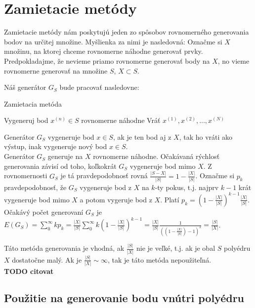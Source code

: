\chapter{Zamietacie metódy}

Zamietacie metódy nám poskytujú jeden zo spôsobov rovnomerného generovania bodov na určitej množine.
Myšlienka za nimi je nasledovná: Označme si $X$ množinu, na ktorej chceme rovnomerne náhodne generovať prvky. Predpokladajme, že nevieme priamo rovnomerne generovať body na $X$, no vieme rovnomerne generovať na množine $S$, $X \subset S$.

Náš generátor $G_S$ bude pracovať nasledovne:

\begin{algorithm}[H]
	\caption{Zamietacia metóda}
	\label{zamietanie:basic}
	\begin{algorithmic}[1]
			\Repeat Vygeneruj bod $x^{(n)} \in S$ rovnomerne náhodne
		\EndFor
		\State Vráť ${x^{(1)},x^{(2)},\dots,x^{(N)}}$
	\end{algorithmic}
\end{algorithm}
Generátor $G_S$ vygeneruje bod $x \in S$, ak je ten bod aj z $X$, tak ho vráti ako výstup, inak vygeneruje nový bod $x \in S$.\\

Generátor $G_S$ generuje na $X$ rovnomerne náhodne. Očakávaná rýchlosť generovania závisí od toho, koľkokrát $G_S$ vygeneruje bod mimo $X$. Z rovnomernosti $G_S$ je tá pravdepodobnosť rovná $\frac{|S-X|}{|S|} = 1-\frac{|X|}{|S|}$. Označme si $p_k$ pravdepodobnosť, že $G_S$ vygeneruje bod z $X$ na $k$-ty pokus, t.j. najprv $k-1$ krát vygeneruje bod mimo $X$ a potom vygeruje bod z $X$. Platí $p_k= (1-\frac{|X|}{|S|})^{k-1}\frac{|X|}{|S|}$. Očakávý počet generovaní $G_S$ je $E(G_S)=\sum^{\infty}_{0}kp_k=\frac{|X|}{|S|} \sum^{\infty}_{0}k(1-\frac{|X|}{|S|})^{k-1}=\frac{|X|}{|S|} \frac{1}{((1-\frac{|X|}{|S|})-1)^2} = \frac{|S|}{|X|}$.

Táto metóda generovania je vhodná, ak $\frac{|S|}{|X|}$ nie je veľké, t.j. ak je obal $S$ polyédru $X$ dostatočne malý. Ak je $\frac{|S|}{|X|} \sim \infty$, tak je táto metóda nepoužiteľná.\\

\textbf{TODO citovat}

\section{Použitie na generovanie bodu vnútri polyédru}

